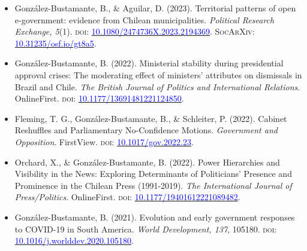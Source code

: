 \begin{publications}

\begin{itemize}

\item{González-Bustamante, B., \& Aguilar, D. (2023). Territorial patterns of open e-government: evidence from Chilean municipalities. {\itshape Political Research Exchange, 5}(1). {\scshape doi:} \href{https://doi.org/10.1080/2474736X.2023.2194369}{\textcolor{blue}{10.1080/2474736X.2023.2194369}}. {\scshape \footnotesize SocArXiv:} \href{https://doi.org/10.31235/osf.io/gt8a5}{\textcolor{blue}{10.31235/osf.io/gt8a5}}.}\vspace{1mm}

\item{González-Bustamante, B. (2022). Ministerial stability during presidential approval crises: The moderating effect of ministers' attributes on dismissals in Brazil and Chile. {\itshape The British Journal of Politics and International Relations}. OnlineFirst. {\scshape doi:} \href{https://doi.org/10.1177/13691481221124850}{\textcolor{blue}{10.1177/13691481221124850}}.}\vspace{1mm}

\item{Fleming, T. G., González-Bustamante, B., \& Schleiter, P. (2022). Cabinet Reshuffles and Parliamentary No-Confidence Motions. {\itshape Government and Opposition}. FirstView. {\scshape doi:} \href{https://doi.org/10.1017/gov.2022.23}{\textcolor{blue}{10.1017/gov.2022.23}}.}\vspace{1mm}

\item{Orchard, X., \& González-Bustamante, B. (2022). Power Hierarchies and Visibility in the News: Exploring Determinants of Politicians’ Presence and Prominence in the Chilean Press (1991-2019). {\itshape The International Journal of Press/Politics}. OnlineFirst. {\scshape doi:} \href{https://doi.org/10.1177/19401612221089482}{\textcolor{blue}{10.1177/19401612221089482}}.}\vspace{1mm}

\item{González-Bustamante, B. (2021). Evolution and early government responses to COVID-19 in South America. {\itshape World Development, 137}, 105180. {\scshape doi:} \href{https://doi.org/10.1016/j.worlddev.2020.105180}{\textcolor{blue}{10.1016/j.worlddev.2020.105180}}.}\vspace{1mm}



\end{itemize}
\end{publications}

